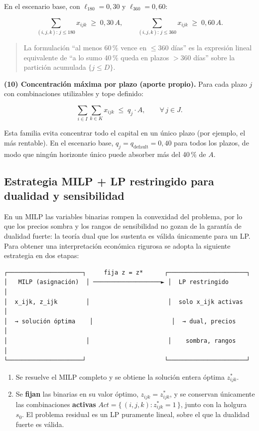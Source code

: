 \documentclass[11pt,a4paper]{article}
\begin{document}
En el escenario base, con $\ell_{180} = 0{,}30$ y $\ell_{360} = 0{,}60$:

\[
\sum_{(i,j,k):\,j \le 180} x_{ijk} \;\ge\; 0{,}30\,A , \qquad
\sum_{(i,j,k):\,j \le 360} x_{ijk} \;\ge\; 0{,}60\,A .
\]

\begin{quote}
La formulación ``al menos 60\,\% vence en $\le 360$ días'' es la expresión lineal equivalente de ``a lo sumo 40\,\% queda en plazos $> 360$ días'' sobre la partición acumulada $\{j \le D\}$.
\end{quote}

\textbf{(10) Concentración máxima por plazo (aporte propio).} Para cada plazo $j$ con combinaciones utilizables y tope definido:

\[
\sum_{i \in I} \sum_{k \in K} x_{ijk} \;\le\; q_j \cdot A, \qquad \forall\, j \in J .
\]

Esta familia evita concentrar todo el capital en un único plazo (por ejemplo, el más rentable). En el escenario base, $q_j = q_{\text{default}} = 0{,}40$ para todos los plazos, de modo que ningún horizonte único puede absorber más del 40\,\% de $A$.

\subsection{Estrategia MILP + LP restringido para dualidad y sensibilidad}

En un MILP las variables binarias rompen la convexidad del problema, por lo que los precios sombra y los rangos de sensibilidad no gozan de la garantía de dualidad fuerte: la teoría dual que los sustenta es válida únicamente para un LP. Para obtener una interpretación económica rigurosa se adopta la siguiente estrategia en dos etapas:

\begin{lstlisting}
┌─────────────────────┐     fija z = z*      ┌──────────────────────┐
│   MILP (asignación)  │ ───────────────────► │  LP restringido       │
│  x_ijk, z_ijk        │                      │  solo x_ijk activas   │
│  → solución óptima    │                      │  → dual, precios       │
│                      │                      │    sombra, rangos      │
└─────────────────────┘                      └──────────────────────┘
\end{lstlisting}

\begin{enumerate}
  \item Se resuelve el MILP completo y se obtiene la solución entera óptima $z^*_{ijk}$.
  \item Se \textbf{fijan} las binarias en su valor óptimo, $z_{ijk} = z^*_{ijk}$, y se conservan únicamente las combinaciones \textbf{activas} $Act = \{\, (i, j, k) : z^*_{ijk} = 1 \,\}$, junto con la holgura $s_0$. El problema residual es un LP puramente lineal, sobre el que la dualidad fuerte es válida.
\end{enumerate}
\end{document}
